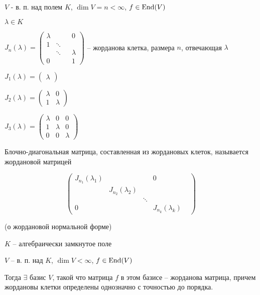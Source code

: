     $V$ - в. п. над полем $K$, $\dim V = n < \infty$, $f \in \operatorname{End}(V)$
    \par $\lambda \in K$
    \par
    \par $J_n(\lambda) = \begin{pmatrix}
        \lambda & & & 0 \\
        1 & \ddots & & \\
        & \ddots & & \lambda \\
        0 & & & 1
    \end{pmatrix}$ -- жорданова клетка, размера $n$, отвечающая $\lambda$
    \par
    \par $J_1(\lambda) = \begin{pmatrix}
        \lambda
    \end{pmatrix}$
    \par $J_2(\lambda) = \begin{pmatrix}
        \lambda & 0 \\
        1 & \lambda
    \end{pmatrix}$
    \par $J_3(\lambda) = \begin{pmatrix}
        \lambda & 0 & 0 \\
        1 & \lambda & 0 \\
        0 & 0 & \lambda
    \end{pmatrix}$

    \begin{definition}
        Блочно-диагональная матрица, составленная из жордановых клеток, называется жордановой матрицей 
    \end{definition}

    \[
        \begin{pmatrix}
            \boxed{J_{n_1}(\lambda_1)} & & & 0 \\
            & \boxed{J_{n_2}(\lambda_2)} & & \\
            & & \ddots & & \\
            0 & & & \boxed{J_{n_k}(\lambda_k)}
        \end{pmatrix}    
    \]

    \pagebreak

    \begin{theorem}
        (о жордановой нормальной форме)
        \par $K$ -- алгебраически замкнутое поле
        \par $V$ -- в. п. над $K$, $\dim V < \infty$, $f \in \operatorname{End}(V)$
        \par Тогда $\exists$ базис $V$, такой что матрица $f$ в этом базисе -- жорданова матрица, причем 
        жордановы клетки определены однозначно с точностью до порядка.
    \end{theorem}
    
